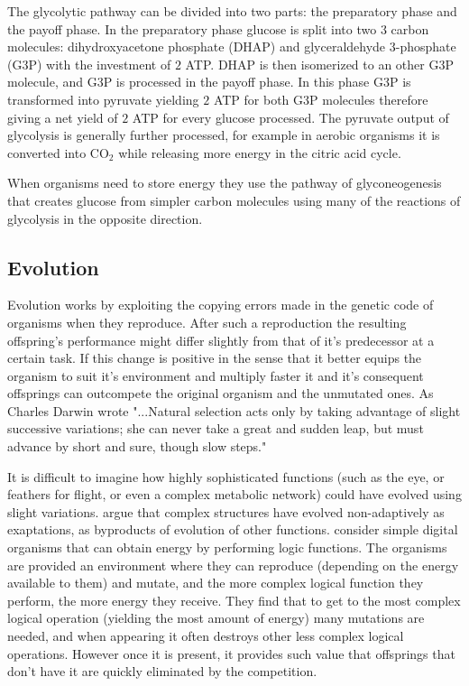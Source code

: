 \documentclass[a4paper,12pt]{article}
\begin{document}
The glycolytic pathway can be divided into two parts: the preparatory phase and the payoff phase. In the preparatory phase glucose is split into two $3$ carbon molecules: dihydroxyacetone phosphate (DHAP) and glyceraldehyde 3-phosphate (G3P) with the investment of $2$ ATP. DHAP is then isomerized to an other G3P molecule, and G3P is processed in the payoff phase. In this phase G3P is transformed into pyruvate yielding $2$ ATP for both G3P molecules therefore giving a net yield of $2$ ATP for every glucose processed. The pyruvate output of glycolysis is generally further processed, for example in aerobic organisms it is converted into CO$_2$ while releasing more energy in the citric acid cycle. 

When organisms need to store energy they use the pathway of glyconeogenesis that creates glucose from simpler carbon molecules using many of the reactions of glycolysis in the opposite direction. %
	
	\subsection{Evolution}\label{chap:evolution}
	
	Evolution works by exploiting the copying errors made in the genetic code of organisms when they reproduce. After such a reproduction the resulting offspring's performance might differ slightly from that of it's predecessor at a certain task. If this change is positive in the sense that it better equips the organism to suit it's environment and multiply faster it and it's consequent offsprings can outcompete the original organism and the unmutated ones.  As Charles Darwin wrote "...Natural selection acts only by taking advantage of slight successive variations; she can never take a great and sudden leap, but must advance by short and sure, though slow steps." \cite{darwin} 
	
	It is difficult to imagine how highly sophisticated functions (such as the eye, or feathers for flight, or even a complex metabolic network) could have evolved using slight variations. \cite{latent} argue that complex structures have evolved non-adaptively as exaptations, as byproducts of evolution of other functions. \cite{complexfeatures}  consider simple digital organisms that can obtain energy by performing logic functions. The organisms are provided an environment where they can reproduce (depending on the energy available to them) and mutate, and the more complex logical function they perform, the more energy they receive. They find that to get to the most complex logical operation (yielding the most amount of energy) many mutations are needed, and when appearing it often destroys other less complex logical operations. However once it is present, it provides such value that offsprings that don't have it are quickly eliminated by the competition. %
	
\end{document}
